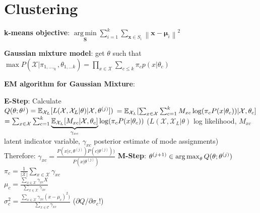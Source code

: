 \section{Clustering}

\textbf{k-means objective}: $\underset{\mathbf{S}} {\operatorname{arg\,min}}  \sum_{i=1}^{k} \sum_{\mathbf x \in S_i} \left\| \mathbf x - \boldsymbol\mu_i \right\|^2$

\textbf{Gaussian mixture model}: get $\theta$ such that\\
$\max P(\mathcal{X}|\pi_{1,...,_k},\theta_{1,...k})=\prod_{x\in\mathcal{X}}\sum_{c\leq k}\pi_c p(x|\theta_c)$


\textbf{EM algorithm for Gaussian Mixture}:

\begin{algorithmic}[1]
	\State \textbf{E-Step}: Calculate\\
        $Q(\theta;\theta^{j})=\mathbb E_{\mathcal{X}_L}[L(\mathcal{X},\mathcal{X}_L|\theta)|\mathcal{X},\theta^{(j)}])$
        $=\mathbb E_{\mathcal{X}_L}[\sum_{x\in\mathcal{X}}\sum_{c=1}^k M_{xc}\log(\pi_c P(x|\theta_c))|\mathcal{X},\theta_c]$ 
        $=\sum_{x\in\mathcal{X}}\sum_{c=1}^k\underbrace{\mathbb E_{\mathcal{X}_L}[M_{xc}|\mathcal{X},\theta_c]}_{\gamma_{xc}}\log(\pi_c P(x|\theta_c))$
        ($L(\mathcal{X},\mathcal{X}_L|\theta)$ log likelihood, $M_{xc}$ latent indicator variable, $\gamma_{xc}$ posterior estimate of mode assignments)\\
        Therefore: $\gamma_{xc}=\frac{P(x|c,\theta^{(j)})P(c|\theta^{(j)}))}{P(x|\theta^{(j)})}$
	\State \textbf{M-Step}: $\theta^{(j+1)}\in \operatorname*{arg\,max}_\theta Q(\theta; \theta^{(j)})$\\
	$\pi_c=\frac{1}{|\mathcal{X}|}\sum_{x\in\mathcal{X}}\gamma_{xc}$\\
	$\mu_c=\frac{\sum_{x\in\mathcal{X}}\gamma_{xc}X}{\sum_{x\in\mathcal{X}}\gamma_{xc}}$\\
	$\sigma^2_c=\frac{\sum_{x\in\mathcal{X}}\gamma_{xc}(x-\mu_c)^2)}{\sum_{x\in\mathcal{C}}\gamma_{xc}}$ ($\partial Q/\partial \sigma_c$!)
\end{algorithmic}




